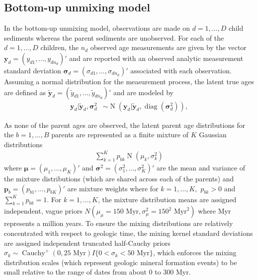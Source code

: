 \subsection{Bottom-up unmixing model}

In the bottom-up unmixing model, observations are made on $d = 1, \ldots, D$ child sediments whereas the parent sediments are unobserved. For each of the $d = 1, \ldots, D$ children, the $n_d$ observed age measurements are given by the vector $\mathbf{y}_d = (y_{d1}, \ldots, y_{dn_d})'$ and are reported with an observed analytic measurement standard deviation $\boldsymbol{\sigma}_d = (\sigma_{d1}, \ldots, \sigma_{dn_d})'$ associated with each observation. Assuming a normal distribution for the measurement process, the latent true ages are defined as $\tilde{\mathbf{y}}_d = (\tilde{y}_{d1}, \ldots, \tilde{y}_{dn_d})'$ and are modeled by 
\begin{align*}
\mathbf{y}_d | \tilde{\mathbf{y}}_d, \boldsymbol{\sigma}_d^2 & \sim \operatorname{N} (\mathbf{y}_d | \tilde{\mathbf{y}}_d, \operatorname{diag} ( \boldsymbol{\sigma}_d^2 ) ), 
\end{align*}

As none of the parent ages are observed, the latent parent age distributions for the $b = 1, \ldots, B$ parents are represented as a finite mixture of $K$ Gaussian distributions 
\begin{align*}
\sum_{k=1}^K p_{bk} \operatorname{N} \left( \mu_{k}, \sigma^2_{k} \right) 
\end{align*}
where $\boldsymbol{\mu} = (\mu_1, \ldots, \mu_K)'$ and $\boldsymbol{\sigma}^2 = (\sigma^2_1, \ldots, \sigma^2_K)'$ are the mean and variance of the mixture distributions (which are shared across each of the parents) and $\mathbf{p}_{b} = (p_{b1}, \ldots, p_{bK})'$ are mixture weights where for $k = 1, \ldots, K,$ $p_{bk} > 0$ and $\sum_{k=1}^K p_{bk} = 1$. For $k = 1, \ldots, K$, the mixture distribution means are assigned independent, vague priors $N(\mu_\mu = 150 \mbox{ Myr}, \sigma^2_\mu = 150^2 \mbox{ Myr}^2)$ where Myr represents a million years. To ensure the mixing distributions are relatively concentrated with respect to geologic time, the mixing kernel standard deviations are assigned independent truncated half-Cauchy priors $\sigma_k \sim \operatorname{Cauchy}^+(0, 25 \mbox{ Myr})I\{0 < \sigma_k < 50 \mbox{ Myr}\}$, which enforces the mixing distribution scales (which represent geologic mineral formation events) to be small relative to the range of dates from about 0 to 300 Myr.


